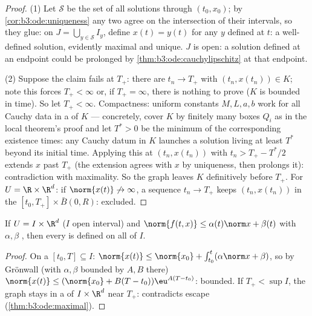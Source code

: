 \begin{proof}
(1) Let $\mathcal S$ be the set of all solutions through
$(t_0, x_0)$; by \cref{cor:b3:ode:uniqueness} any two agree on
the intersection of their intervals, so they glue: on $J =
\bigcup_{y \in \mathcal S}I_y$, define $x(t) = y(t)$ for any
$y$ defined at $t$: a well-defined solution, evidently
maximal and unique. $J$ is open: a solution defined at an
endpoint could be prolonged by
\cref{thm:b3:ode:cauchylipschitz} at that endpoint.

(2) Suppose the claim fails at $T_+$: there are $t_n \to
T_+$ with $(t_n, x(t_n)) \in K$; note this forces $T_+ <
\infty$ or, if $T_+ = \infty$, there is nothing to prove ($K$
is bounded in time). So let $T_+ < \infty$. Compactness: uniform constants $M, L, a,
b$ work for all Cauchy data in a  of $K$
--- concretely, cover $K$ by finitely many boxes $Q_i$ as in
the local theorem's proof and let $T^* > 0$ be the minimum of
the corresponding existence times: any Cauchy datum in $K$
launches a solution living at least $T^*$ beyond its initial
time. Applying this at $(t_n, x(t_n))$ with $t_n > T_+ -
T^*/2$ extends $x$ past $T_+$ (the extension agrees with $x$
by uniqueness, then prolongs it): contradiction with
maximality. So the graph leaves $K$ definitively before
$T_+$. For $U = \R\times\R^d$: if $\norm{x(t)}\not\to\infty$,
a sequence $t_n \to T_+$ keeps $(t_n, x(t_n))$ in the 
$[t_0, T_+]\times\bar B(0, R)$: excluded.
\end{proof}

\begin{corollary}
\label{cor:b3:ode:globallinear}
If $U = I\times\R^d$ ($I$ open interval) and $\norm{f(t, x)}
\leq \alpha(t)\norm x + \beta(t)$ with $\alpha, \beta$
, then every  is defined on all of
$I$.
\end{corollary}

\begin{proof}
On a  $[t_0, T] \subseteq I$: $\norm{x(t)} \leq
\norm{x_0} + \int_{t_0}^t(\alpha\norm x + \beta)$, so by
Gr\"onwall (with $\alpha, \beta$ bounded by $A, B$ there)
$\norm{x(t)} \leq (\norm{x_0} + B(T - t_0))\eu^{A(T - t_0)}$:
bounded. If $T_+ < \sup I$, the graph stays in a  of
$I\times\R^d$ near $T_+$: contradicts escape
(\cref{thm:b3:ode:maximal}).
\end{proof}

